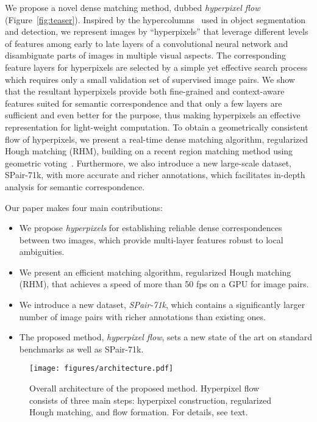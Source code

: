 \documentclass[10pt,twocolumn,letterpaper]{article}
\begin{document}
We propose a novel dense matching method, dubbed {\em hyperpixel flow} (Figure~\ref{fig:teaser}). Inspired by the hypercolumns~\cite{hariharan2015hypercolumns} used in object segmentation and detection, we represent images by ``hyperpixels'' that leverage different levels of features among early to late layers of a convolutional neural network and disambiguate parts of images in multiple visual aspects. The corresponding feature layers for hyperpixels are selected by a simple yet effective search process which requires only a small validation set of supervised image pairs.  
We show that the resultant hyperpixels provide both fine-grained and context-aware features suited for semantic correspondence and that only a few layers are sufficient and even better for the purpose, thus making hyperpixels an effective representation for light-weight computation. To obtain a geometrically consistent flow of hyperpixels, we present a real-time dense matching algorithm, regularized Hough matching (RHM), building on a recent region matching method using geometric voting~\cite{cho2015unsupervised}. 
Furthermore, we also introduce a new large-scale dataset, SPair-71k, with more accurate and richer annotations, which facilitates in-depth analysis for semantic correspondence.



Our paper makes four main contributions:\vspace{-5px}
\begin{itemize}
\setlength\itemsep{0em}
    \item We propose {\em hyperpixels} for establishing reliable dense correspondences between two images, which provide multi-layer features robust to local ambiguities.
    \item We present an efficient matching algorithm, regularized Hough matching (RHM), that achieves a speed of more than 50 fps on a GPU for  image pairs.
    \item We introduce a new dataset, {\em SPair-71k}, which contains a significantly larger number of image pairs with richer annotations than existing ones.
    \item The proposed method, {\em hyperpixel flow}, sets a new state of the art on standard benchmarks as well as SPair-71k.
\end{itemize} 

\begin{figure*}
    \begin{center}
        \texttt{[image: figures/architecture.pdf]}
    \end{center}
    \vspace{-2.0mm} 
       \caption{Overall architecture of the proposed method. Hyperpixel flow consists of three main steps: hyperpixel construction, regularized Hough matching, and flow formation. For details, see text.}
    \vspace{-3.0mm} 
\label{fig:architecture}
\end{figure*}
\end{document}
